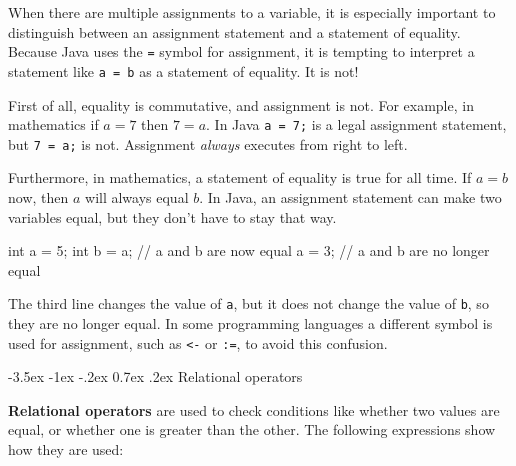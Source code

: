 \documentclass[12pt]{book}
\makeatletter
\theoremstyle{exercise}
\newcommand{\java}[1]{\verb"#1"}
\renewcommand{\section}{\@startsection {section}{1}{\z@}%
    {-3.5ex \@plus -1ex \@minus -.2ex}%
    {0.7ex \@plus.2ex}%
    {\normalfont\Large\bfseries}}
\newcommand{\java}[1]{\lstinline{#1}} %
\makeatother
\begin{document}
%
%

When there are multiple assignments to a variable, it is especially important to distinguish between an assignment statement and a statement of equality.
Because Java uses the \java{=} symbol for assignment, it is tempting to interpret a statement like \java{a = b} as a statement of equality.
It is not!

First of all, equality is commutative, and assignment is not.
For example, in mathematics if $a = 7$ then $7 = a$.
In Java \java{a = 7;} is a legal assignment statement, but \java{7 = a;} is not.
Assignment {\em always} executes from right to left.

Furthermore, in mathematics, a statement of equality is true for all time.
If $a = b$ now, then $a$ will always equal $b$.
In Java, an assignment statement can make two variables equal, but they don't have to stay that way.

\begin{code}
    int a = 5;
    int b = a;     // a and b are now equal
    a = 3;         // a and b are no longer equal
\end{code}

The third line changes the value of \java{a}, but it does not change the value of \java{b}, so they are no longer equal.
In some programming languages a different symbol is used for assignment, such as {\tt <-} or {\tt :=}, to avoid this confusion.



\section{Relational operators}


{\bf Relational operators} are used to check conditions like whether two values are equal, or whether one is greater than the other.
The following expressions show how they are used:
\end{document}
